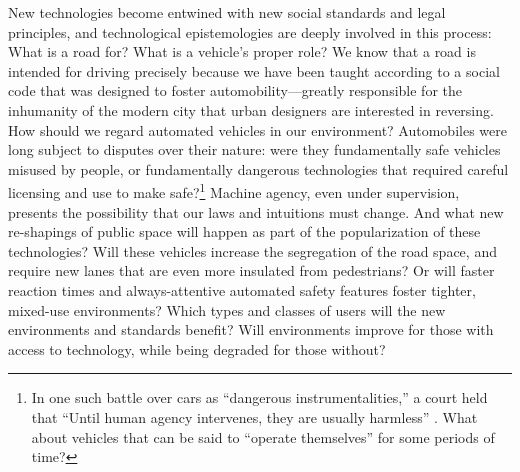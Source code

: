 



New technologies become entwined with new social standards
and legal principles, and technological epistemologies are deeply involved
in this process: What is a road for? What is a vehicle's
proper role? We know that a road is intended for driving precisely
because we have been taught according to a social code that was
designed to foster automobility---greatly responsible for the
inhumanity of the modern city that urban designers are interested
in reversing. How should we regard automated vehicles in our environment?
Automobiles were long subject to disputes over their nature: were they
fundamentally safe vehicles misused by people, or fundamentally
dangerous technologies that required careful licensing and use to
make safe?\footnote{In one such battle over cars as ``dangerous
instrumentalities,'' a court held that ``Until human agency
intervenes, they are usually 
harmless'' \cite[p. 70]{lochlannjain}. What about vehicles that can
be said to ``operate
themselves'' for some periods of time?} Machine agency, even under
supervision, presents the 
possibility that our laws and intuitions must change.
And what new re-shapings of public space will happen as part of the 
popularization of these technologies? Will these vehicles increase the
segregation of the road space, and require new lanes that are even
more insulated from pedestrians? Or will faster reaction times and
always-attentive automated safety features foster tighter, mixed-use
environments? Which types and classes of users will the new environments
and standards benefit? Will environments improve for those with access
to technology, while being degraded for those without?


